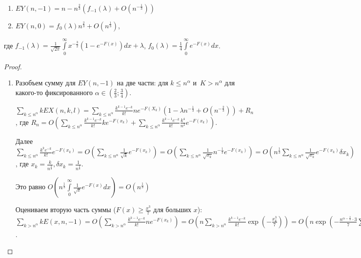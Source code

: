\documentclass{article}
\begin{document}
\begin{lemma}~
	\begin{enumerate}
		\item $EY(n, -1) = n - n^\frac{2}{3}(f_{-1}(\lambda) + O(n^{-\frac{1}{3}}))$
		\item $EY(n, 0) = f_0(\lambda) n^\frac{2}{3} + O(n^\frac{1}{3})$,
	\end{enumerate}
	где $f_{-1}(\lambda) = \frac{1}{\sqrt{2\pi}} \int\limits_0^\infty x^{-\frac{3}{2}} (1 -
	e^{-F(x)}) dx + \lambda$, $f_0(\lambda) = \frac{1}{4} \int\limits_0^\infty e^{-F(x)} dx$.
\end{lemma}
\begin{proof}
	\begin{enumerate}
		\item Разобъем сумму для $EY(n, -1)$ на две части: для $k \le n^\alpha$ и~$K > n^\alpha$ для
			какого-то фиксированного $\alpha \in (\frac{2}{3}; \frac{3}{4})$.

			$\sum\limits_{k \le n^\alpha} kEX(n, k, l) = \sum\limits_{k \le n^\alpha}
			\frac{k^{k-1}e^{-k}}{k!} n e^{-F(X_k)} (1 - \lambda n^{-\frac{1}{3}} + O(n^{-\frac{2}{3}})) +
			R_n$, где $R_n = O\left(\sum\limits_{k \le n^\alpha} \frac{k^{k-1} e^{-k}}{k!} k e^{-F(x_k)} +
			\sum\limits_{k \le n^\alpha} \frac{k^{k-1} e^{-k}}{k!} \frac{k^4}{n^2} e^{-F(x_k)}\right)$.

			Далее $\sum\limits_{k \le n^\alpha} \frac{k^k e^{-k}}{k!} e^{-F(x_k)} = O\left(\sum\limits_{k
			\le n^\alpha} \frac{1}{\sqrt{k}} e^{-F(x_k)}\right) = O\left( \sum\limits_{k \le n^\alpha}
			\frac{1}{\sqrt{x_k}} n^{-\frac{1}{3}} e^{-F(x_k)}\right) = O\left( n^\frac{1}{3}
			\sum\limits_{k \le n^\alpha} \frac{1}{\sqrt{x_k}} e^{-F(x_k)} \delta x_k \right)$, где $x_k =
			\frac{k}{n^\frac{2}{3}}, \delta x_k = \frac{1}{n^\frac{2}{3}}$.

			Это равно $O\left(n^\frac{1}{3} \int\limits_0^\infty \frac{1}{\sqrt{x}} e^{-F(x)} dx\right) =
			O\left(n^\frac{1}{3}\right)$

			Оцениваем вторую часть суммы ($F(x) \ge \frac{x^3}{7}$ для больших $x$):
			$\sum\limits_{k > n^\alpha} kE(x, n, -1) = O\left(\sum\limits_{k > n^\alpha} \frac{k^{k-1}
			e^{-k}}{k!} n e^{-F(x_k)}\right) = O\left(n \sum\limits_{k > n^\alpha} \frac{k^{k-1}
			e^{-k}}{k!} \exp(-\frac{x_k^3}{7})\right) = O\left(n \exp(-\frac{n^{\alpha - \frac{2}{3}}
			\cdot 3} {7} \sum\limits_{k > n^\alpha} \frac{k^{k-1} e^{-k}}{k!} )\right) =
			O\left(n e^{-\frac{1}{7} n^{3\alpha - 2} \sum\limits_k \frac{k^{k-1} e^{-k}}{k!} }\right) =
			O\left(n^\frac{1}{3}\right)$.


\end{enumerate}
\end{proof}
\end{document}
